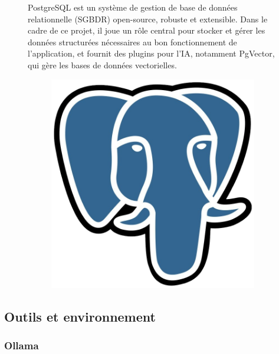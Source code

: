\documentclass[12pt,a4paper]{report}
\begin{document}
	\begin{figure}[H]
		\begin{minipage}{0.8\textwidth}
			PostgreSQL est un système de gestion de base de données relationnelle (SGBDR) open-source, robuste et extensible. Dans le cadre de ce projet, il joue un rôle central pour stocker et gérer les données structurées nécessaires au bon fonctionnement de l’application, et fournit des plugins pour l'IA, notamment PgVector, qui gère les bases de données vectorielles.
		\end{minipage}
		\hfill
		\begin{minipage}{0.15\textwidth} 
			\begin{figure}[H]
				\centering
				\includegraphics[width=\linewidth]{postgresql-logo.png}
				\label{fig:postgresql-logo}
			\end{figure}
		\end{minipage}
	\end{figure}
	
	\subsection{Outils et environnement}
	
	\subsubsection{Ollama}
	
\end{document}
